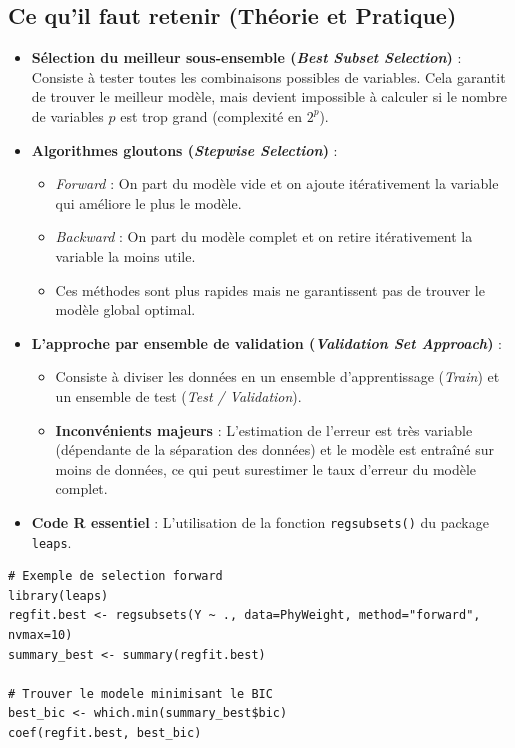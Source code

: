 \subsection{Ce qu'il faut retenir (Théorie et Pratique)}
\begin{itemize}
    \item \textbf{Sélection du meilleur sous-ensemble (\textit{Best Subset Selection})} : Consiste à tester toutes les combinaisons possibles de variables. Cela garantit de trouver le meilleur modèle, mais devient impossible à calculer si le nombre de variables $p$ est trop grand (complexité en $2^p$).
    \item \textbf{Algorithmes gloutons (\textit{Stepwise Selection})} :
    \begin{itemize}
        \item \textit{Forward} : On part du modèle vide et on ajoute itérativement la variable qui améliore le plus le modèle.
        \item \textit{Backward} : On part du modèle complet et on retire itérativement la variable la moins utile.
        \item Ces méthodes sont plus rapides mais ne garantissent pas de trouver le modèle global optimal.
    \end{itemize}
    \item \textbf{L'approche par ensemble de validation (\textit{Validation Set Approach})} :
    \begin{itemize}
        \item Consiste à diviser les données en un ensemble d'apprentissage (\textit{Train}) et un ensemble de test (\textit{Test / Validation}).
        \item \textbf{Inconvénients majeurs} : L'estimation de l'erreur est très variable (dépendante de la séparation des données) et le modèle est entraîné sur moins de données, ce qui peut surestimer le taux d'erreur du modèle complet.
    \end{itemize}
    \item \textbf{Code R essentiel} : L'utilisation de la fonction \texttt{regsubsets()} du package \texttt{leaps}.
\end{itemize}

\begin{lstlisting}
# Exemple de selection forward
library(leaps)
regfit.best <- regsubsets(Y ~ ., data=PhyWeight, method="forward", nvmax=10)
summary_best <- summary(regfit.best)

# Trouver le modele minimisant le BIC
best_bic <- which.min(summary_best$bic)
coef(regfit.best, best_bic)
\end{lstlisting}

